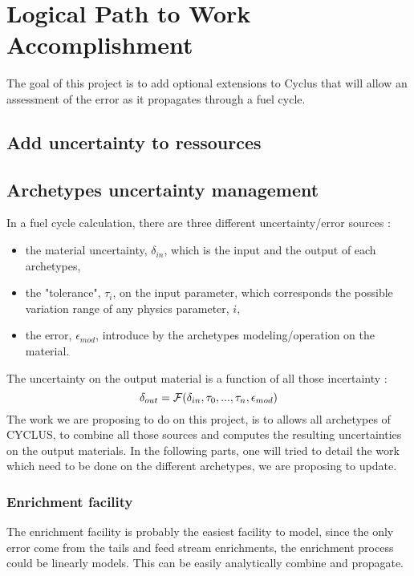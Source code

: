 \documentclass[dvips,12pt]{article}
\begin{document}
\section{Logical Path to Work Accomplishment}
The goal of this project is to add optional extensions to Cyclus that will allow an assessment of the error as it propagates  through a fuel cycle. 
\subsection{Add uncertainty to ressources}

\subsection{Archetypes uncertainty management}
In a fuel cycle calculation, there are three different uncertainty/error sources :
\begin{itemize}
\item the material uncertainty, $\delta_{in}$, which is the input and the output of each archetypes,
\item the "tolerance", $\tau_{i}$,  on the input parameter, which corresponds the possible variation range of any physics parameter, $i$,
\item the error, $\epsilon_{mod}$, introduce by the archetypes modeling/operation on the material.
\end{itemize}

The uncertainty on the output  material is a function of all those incertainty :
\begin{equation}
\delta_{out} = {\cal F}( \delta _{in}, \tau_0,...,\tau_n,\epsilon_{mod})
\end{equation}
The work we are proposing to do on this project, is to allows all archetypes of CYCLUS, to combine all those sources and computes the resulting uncertainties on the output materials.
In the following parts, one will tried to detail the work which need to be done on the different archetypes, we are proposing to update.
\subsubsection{Enrichment facility}
The enrichment facility is probably the easiest facility to model, since the only error come from the tails and feed stream enrichments, the enrichment process could be linearly models. This can be easily analytically combine and propagate.%
\end{document}

